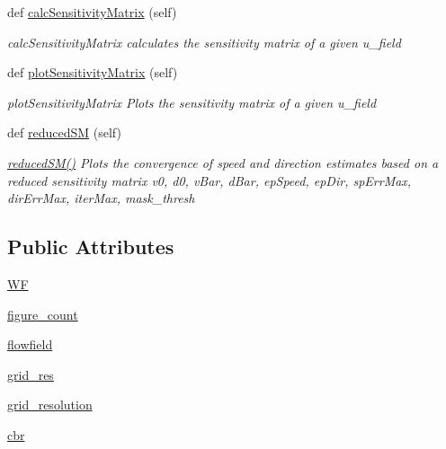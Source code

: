 \begin{DoxyCompactItemize}
def \mbox{\hyperlink{classvisualization__manager___d_j_1_1_visualization_manager_a979c45975c192515cbc17da7c07d2af3}{calc\+Sensitivity\+Matrix}} (self)
\begin{DoxyCompactList}\small\item\em calc\+Sensitivity\+Matrix calculates the sensitivity matrix of a given u\+\_\+field \end{DoxyCompactList}\item 
def \mbox{\hyperlink{classvisualization__manager___d_j_1_1_visualization_manager_a32793e43e3e04b3819dea7740e5b9ca1}{plot\+Sensitivity\+Matrix}} (self)
\begin{DoxyCompactList}\small\item\em plot\+Sensitivity\+Matrix Plots the sensitivity matrix of a given u\+\_\+field \end{DoxyCompactList}\item 
def \mbox{\hyperlink{classvisualization__manager___d_j_1_1_visualization_manager_a92c5f58eddce15c3fa19edd63e66ef43}{reduced\+SM}} (self)
\begin{DoxyCompactList}\small\item\em \mbox{\hyperlink{classvisualization__manager___d_j_1_1_visualization_manager_a92c5f58eddce15c3fa19edd63e66ef43}{reduced\+S\+M()}} Plots the convergence of speed and direction estimates based on a reduced sensitivity matrix v0, d0, v\+Bar, d\+Bar, ep\+Speed, ep\+Dir, sp\+Err\+Max, dir\+Err\+Max, iter\+Max, mask\+\_\+thresh \end{DoxyCompactList}\end{DoxyCompactItemize}
\subsection*{Public Attributes}
\begin{DoxyCompactItemize}
\item 
\mbox{\hyperlink{classvisualization__manager___d_j_1_1_visualization_manager_a56add1b450c7ecd758b096117f593578}{WF}}
\item 
\mbox{\hyperlink{classvisualization__manager___d_j_1_1_visualization_manager_add58b653067c1364e389b5a9ea1e4f5b}{figure\+\_\+count}}
\item 
\mbox{\hyperlink{classvisualization__manager___d_j_1_1_visualization_manager_aadb6e88d03aa67b6045f66dcad66799c}{flowfield}}
\item 
\mbox{\hyperlink{classvisualization__manager___d_j_1_1_visualization_manager_ad34898259a1773b5e43ab50eae783e1d}{grid\+\_\+res}}
\item 
\mbox{\hyperlink{classvisualization__manager___d_j_1_1_visualization_manager_ad5b8013f5cdf47f6384ae56186810e2b}{grid\+\_\+resolution}}
\item 
\mbox{\hyperlink{classvisualization__manager___d_j_1_1_visualization_manager_a5ebbc21771a576316065fac66b67c292}{cbr}}
\end{DoxyCompactItemize}


